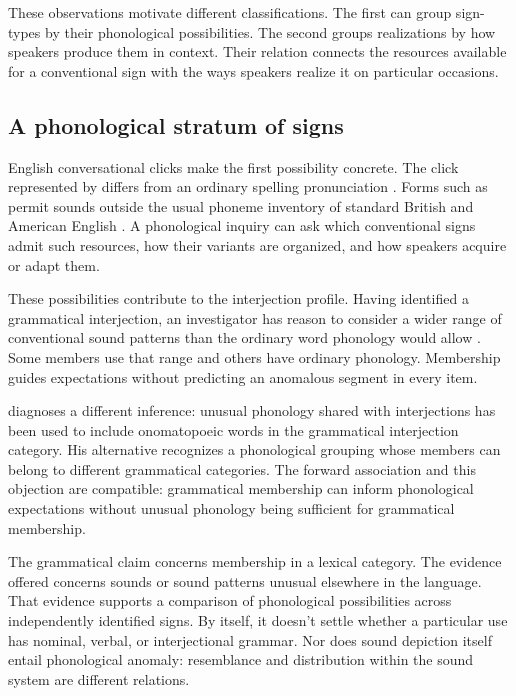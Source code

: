 \documentclass[12pt]{article}
\begin{document}
These observations motivate different classifications. The first can group
sign-types by their phonological possibilities. The second groups realizations
by how speakers produce them in context. Their relation connects
the resources available for a conventional sign with the ways speakers
realize it on particular occasions.

\subsection{A phonological stratum of signs}

English conversational clicks make the first possibility concrete. The
click represented by  differs from an ordinary spelling
pronunciation \citep[147]{wilkins1992}. Forms such as  permit
sounds outside the usual phoneme inventory of standard British and
American English \citep[74, 853]{quirk1985}. A phonological inquiry can
ask which conventional signs admit such resources, how their variants are
organized, and how speakers acquire or adapt them.

These possibilities contribute to the interjection profile. Having
identified a grammatical interjection, an investigator has reason to
consider a wider range of conventional sound patterns than the ordinary
word phonology would allow \citep[105--106]{ameka1992}. Some members
use that range and others have ordinary phonology. Membership guides
expectations without predicting an anomalous segment in every item.

\textcite[112--113]{ameka1992} diagnoses a different inference: unusual
phonology shared with interjections has been used to include onomatopoeic
words in the grammatical interjection category. His alternative recognizes
a phonological grouping whose members can belong to different grammatical
categories. The forward association and this objection are compatible:
grammatical membership can inform phonological expectations without unusual
phonology being sufficient for grammatical membership.

The grammatical claim concerns membership in a lexical category. The
evidence offered concerns sounds or sound patterns unusual elsewhere in
the language. That evidence supports a comparison of phonological
possibilities across independently identified signs. By itself, it doesn't
settle whether a particular use has nominal, verbal, or interjectional
grammar. Nor does sound depiction itself entail phonological anomaly: resemblance
and distribution within the sound system are different relations.
\end{document}
